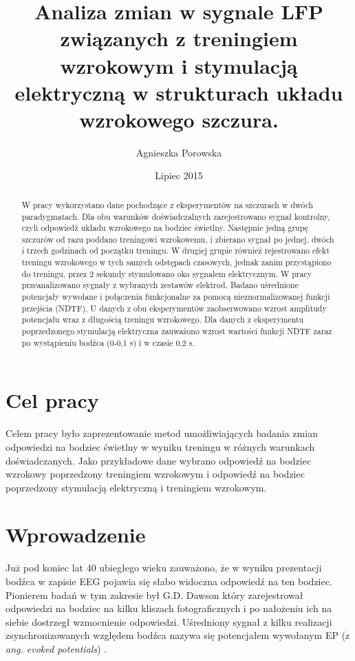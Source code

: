 \documentclass{pracamgr_2}
\author{Agnieszka Porowska}
\title{Analiza zmian w sygnale LFP związanych z treningiem wzrokowym i stymulacją elektryczną w strukturach układu wzrokowego szczura.}
\date{Lipiec 2015}
\begin{document}
	\maketitle
	
	\begin{abstract}
		W pracy wykorzystano dane pochodzące z eksperymentów na szczurach w dwóch paradygmatach. Dla obu warunków doświadczalnych zarejestrowano sygnał kontrolny, czyli odpowiedź układu wzrokowego na bodziec świetlny. Następnie jedną grupę szczurów od razu poddano treningowi wzrokowemu, i zbierano sygnał po jednej, dwóch i trzech godzinach od początku treningu. W drugiej grupie również rejestrowano efekt treningu wzrokowego w tych samych odstępach czasowych, jednak zanim przystąpiono do treningu, przez 2 sekundy stymulowano oko sygnałem elektrycznym. W pracy przeanalizowano sygnały z wybranych zestawów elektrod. Badano uśrednione potencjały wywołane i połączenia funkcjonalne za pomocą nieznormalizowanej funkcji przejścia (NDTF). U danych z obu eksperymentów zaobserwowano wzrost amplitudy potencjału wraz z długością treningu wzrokowego. Dla danych z eksperymentu poprzedzonego stymulacją elektryczna zauważono wzrost wartości funkcji NDTF zaraz po wystąpieniu bodźca (0-0,1 s) i w czasie 0,2 s. 
	\end{abstract}
	
	\tableofcontents
	\chapter*{Cel pracy}
	Celem pracy było zaprezentowanie metod umożliwiających badania zmian odpowiedzi na bodziec świetlny w wyniku treningu w różnych warunkach doświadczanych. Jako przykładowe dane wybrano odpowiedź na bodziec wzrokowy poprzedzony treningiem wzrokowym i odpowiedź na bodziec poprzedzony stymulacją elektryczną i treningiem wzrokowym.
	\chapter{Wprowadzenie}
	Już pod koniec lat 40 ubiegłego wieku zauważono, że w wyniku prezentacji bodźca w zapisie EEG pojawia się słabo widoczna odpowiedź na ten bodziec.  Pionierem badań w tym zakresie był G.D. Dawson który zarejestrował odpowiedzi na bodziec na kilku kliszach fotograficznych i po nałożeniu ich na siebie dostrzegł  wzmocnienie odpowiedzi. Uśredniony sygnał z kilku realizacji zsynchronizowanych względem bodźca nazywa się potencjałem wywołanym EP (z \textit{ang. evoked potentials}) \citep{nieder}.
	
\end{document}

